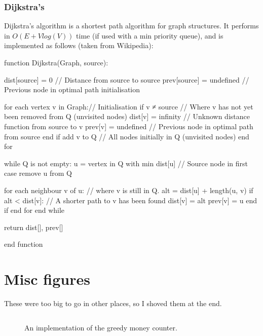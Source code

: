 \subsubsection{Dijkstra's}

Dijkstra's algorithm is a shortest path algorithm for graph structures. It
performs in $O(E + Vlog(V))$ time (if used with a min priority queue), and is
implemented as follows (taken from Wikipedia):

\begin{ccode}
  function Dijkstra(Graph, source):

    dist[source] = 0           // Distance from source to source
    prev[source] = undefined   // Previous node in optimal path initialisation

    for each vertex v in Graph:// Initialisation
      if v ≠ source            // Where v has not yet been removed from Q (unvisited nodes)
        dist[v] = infinity     // Unknown distance function from source to v
        prev[v] = undefined    // Previous node in optimal path from source
      end if 
      add v to Q               // All nodes initially in Q (unvisited nodes)
    end for
    
    while Q is not empty:
      u = vertex in Q with min dist[u]  // Source node in first case
      remove u from Q 
      
      for each neighbour v of u:         // where v is still in Q.
        alt = dist[u] + length(u, v)
        if alt < dist[v]:               // A shorter path to v has been found
          dist[v] = alt 
          prev[v] = u 
        end if
      end for
    end while

    return dist[], prev[]

  end function
\end{ccode}


\section{Misc figures}

These were too big to go in other places, so I shoved them at the end.

\begin{figure}[H]
  \label{greedy}
  \inputminted{java}{code/Greedy/Greedy.java}
  \caption{An implementation of the greedy money counter.}
\end{figure}
